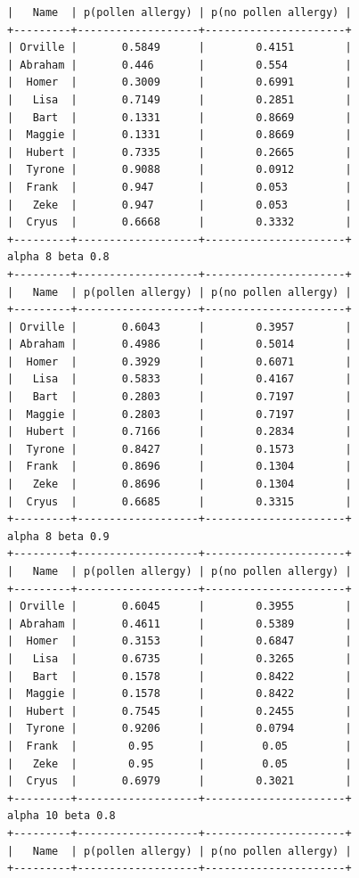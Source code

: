 \documentclass{article}
\begin{document}
\begin{lstlisting}
|   Name  | p(pollen allergy) | p(no pollen allergy) |
+---------+-------------------+----------------------+
| Orville |       0.5849      |        0.4151        |
| Abraham |       0.446       |        0.554         |
|  Homer  |       0.3009      |        0.6991        |
|   Lisa  |       0.7149      |        0.2851        |
|   Bart  |       0.1331      |        0.8669        |
|  Maggie |       0.1331      |        0.8669        |
|  Hubert |       0.7335      |        0.2665        |
|  Tyrone |       0.9088      |        0.0912        |
|  Frank  |       0.947       |        0.053         |
|   Zeke  |       0.947       |        0.053         |
|  Cryus  |       0.6668      |        0.3332        |
+---------+-------------------+----------------------+
alpha 8 beta 0.8
+---------+-------------------+----------------------+
|   Name  | p(pollen allergy) | p(no pollen allergy) |
+---------+-------------------+----------------------+
| Orville |       0.6043      |        0.3957        |
| Abraham |       0.4986      |        0.5014        |
|  Homer  |       0.3929      |        0.6071        |
|   Lisa  |       0.5833      |        0.4167        |
|   Bart  |       0.2803      |        0.7197        |
|  Maggie |       0.2803      |        0.7197        |
|  Hubert |       0.7166      |        0.2834        |
|  Tyrone |       0.8427      |        0.1573        |
|  Frank  |       0.8696      |        0.1304        |
|   Zeke  |       0.8696      |        0.1304        |
|  Cryus  |       0.6685      |        0.3315        |
+---------+-------------------+----------------------+
alpha 8 beta 0.9
+---------+-------------------+----------------------+
|   Name  | p(pollen allergy) | p(no pollen allergy) |
+---------+-------------------+----------------------+
| Orville |       0.6045      |        0.3955        |
| Abraham |       0.4611      |        0.5389        |
|  Homer  |       0.3153      |        0.6847        |
|   Lisa  |       0.6735      |        0.3265        |
|   Bart  |       0.1578      |        0.8422        |
|  Maggie |       0.1578      |        0.8422        |
|  Hubert |       0.7545      |        0.2455        |
|  Tyrone |       0.9206      |        0.0794        |
|  Frank  |        0.95       |         0.05         |
|   Zeke  |        0.95       |         0.05         |
|  Cryus  |       0.6979      |        0.3021        |
+---------+-------------------+----------------------+
alpha 10 beta 0.8
+---------+-------------------+----------------------+
|   Name  | p(pollen allergy) | p(no pollen allergy) |
+---------+-------------------+----------------------+

\end{lstlisting}
\end{document}
